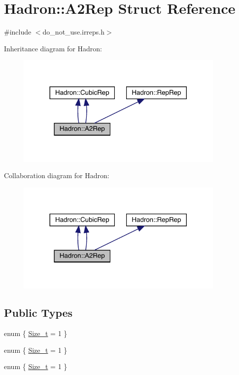 \hypertarget{structHadron_1_1A2Rep}{}\section{Hadron\+:\+:A2\+Rep Struct Reference}
\label{structHadron_1_1A2Rep}


{\ttfamily \#include $<$do\+\_\+not\+\_\+use.\+irreps.\+h$>$}



Inheritance diagram for Hadron\+:\nopagebreak
\begin{figure}[H]
\begin{center}
\leavevmode
\includegraphics[width=288pt]{dd/db7/structHadron_1_1A2Rep__inherit__graph}
\end{center}
\end{figure}


Collaboration diagram for Hadron\+:\nopagebreak
\begin{figure}[H]
\begin{center}
\leavevmode
\includegraphics[width=288pt]{de/ddf/structHadron_1_1A2Rep__coll__graph}
\end{center}
\end{figure}
\subsection*{Public Types}
\begin{DoxyCompactItemize}
\item 
enum \{ \mbox{\hyperlink{structHadron_1_1A2Rep_a2e8e6c192824f04d5e8059e606aea2afada018654f344243e00f8cdd5f1a4eb53}{Size\+\_\+t}} = 1
 \}
\item 
enum \{ \mbox{\hyperlink{structHadron_1_1A2Rep_a2e8e6c192824f04d5e8059e606aea2afada018654f344243e00f8cdd5f1a4eb53}{Size\+\_\+t}} = 1
 \}
\item 
enum \{ \mbox{\hyperlink{structHadron_1_1A2Rep_a2e8e6c192824f04d5e8059e606aea2afada018654f344243e00f8cdd5f1a4eb53}{Size\+\_\+t}} = 1
 \}
\end{DoxyCompactItemize}
